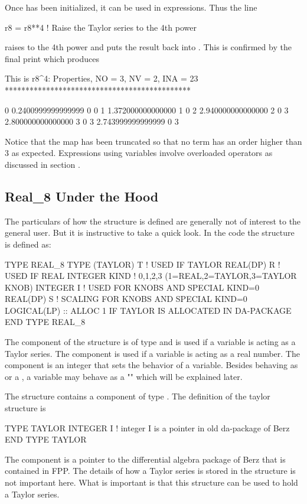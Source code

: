 \documentclass[english,12pt,article]{article} %
\begin{document}
Once  has been initialized, it can be used in expressions. Thus the line
\begin{example}
  r8 = r8**4  ! Raise the Taylor series to the 4th power
\end{example}
raises  to the 4th power and puts the result back into . This is confirmed by the final print which produces
\begin{example}
  This is r8^4:
  Properties, NO =    3, NV =    2, INA =   23
  *********************************************

    0  0.2400999999999999       0  0
    1   1.372000000000000       1  0
    2   2.940000000000000       2  0
    3   2.800000000000000       3  0
    3   2.743999999999999       0  3
\end{example}
Notice that the map has been truncated so that no term has an order higher than 3 as expected. Expressions using  variables involve overloaded operators as discussed in section .

\subsection{Real\_8 Under the Hood}\label{sec:real8}

The particulars of how the  structure is defined are generally not of interest to the general user. But it is instructive to take a quick look. In the  code the  structure is defined as:
\begin{example1}
  TYPE REAL_8
     TYPE (TAYLOR) T      !  USED IF TAYLOR
     REAL(DP) R           !    USED IF REAL
     INTEGER KIND  !  0,1,2,3 (1=REAL,2=TAYLOR,3=TAYLOR KNOB)
     INTEGER I   !   USED FOR KNOBS AND SPECIAL KIND=0
     REAL(DP) S   !   SCALING FOR KNOBS AND SPECIAL KIND=0
     LOGICAL(LP) :: ALLOC  1 IF TAYLOR IS ALLOCATED IN DA-PACKAGE
  END TYPE REAL_8
\end{example1}
The  component of the structure is of type  and is used if a  variable is acting as a Taylor series. The  component is used if a  variable is acting as a real number. The  component is an integer that sets the behavior of a  variable. Besides behaving as  or a , a  variable may behave as a "" which will be explained later.

The  structure contains a component of type . The definition of the taylor structure is
\begin{example1}
  TYPE TAYLOR
     INTEGER I       !  integer I is a pointer in old da-package of Berz
  END TYPE TAYLOR
\end{example1}
The component  is a pointer to the differential algebra package of Berz that is contained in FPP. The details of how a Taylor series is stored in the structure is not important here. What is important is that this structure can be used to hold a Taylor series.
\end{document}
